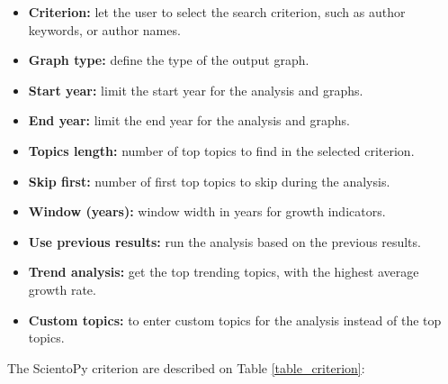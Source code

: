 \documentclass[10pt,letterpaper]{article}
\begin{document}
\begin{itemize}
\item \textbf{Criterion:} let the user to select the search criterion, such as author keywords, or author names. 
\item \textbf{Graph type:} define the type of the output graph.
\item \textbf{Start year:} limit the start year for the analysis and graphs.
\item \textbf{End year:} limit the end year for the analysis and graphs.
\item \textbf{Topics length:} number of top topics to find in the selected criterion.
\item \textbf{Skip first:} number of first top topics to skip during the analysis.
\item \textbf{Window (years):} window width in years for growth indicators.
\item \textbf{Use previous results:} run the analysis based on the previous results.
\item \textbf{Trend analysis:} get the top trending topics, with the highest average growth rate.
\item \textbf{Custom topics:} to enter custom topics for the analysis instead of the top topics.
\end{itemize}


The ScientoPy criterion are described on Table \ref{table_criterion}:
\end{document}
